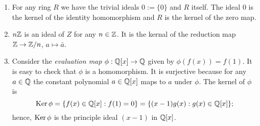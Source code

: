 \begin{example}
    \begin{enumerate}
        \item For any ring $R$ we have the trivial ideals $0 := \{ 0 \}$ and $R$ itself. The ideal $0$ is the kernel of the identity homomorphism and $R$ is the kernel of the zero map.

        \item $n\mathbb{Z}$ is an ideal of $Z$ for any $n \in \mathbb{Z}$. It is the kernal of the reduction map $\mathbb{Z} \to \mathbb{Z}/n$, $a \mapsto \bar a$.

        \item Consider the \emph{evaluation map} $\phi: \mathbb{Q}[x] \to \mathbb{Q}$ given by $\phi(f(x)) = f(1)$. It is easy to check that $\phi$ is a homomorphism. It is surjective because for any $a \in \mathbb{Q}$ the constant polynomial $a \in \mathbb{Q}[x]$ maps to $a$ under $\phi$. The kernel of $\phi$ is
            \[ \operatorname{Ker}\phi = \{ f(x) \in \mathbb{Q}[x] : f(1) = 0\} = \{(x - 1)g(x) : g(x) \in \mathbb{Q}[x]\};\]
            hence, $\operatorname{Ker}\phi$ is the principle ideal $(x - 1)$ in $\mathbb{Q}[x]$.
    \end{enumerate}
\end{example}
